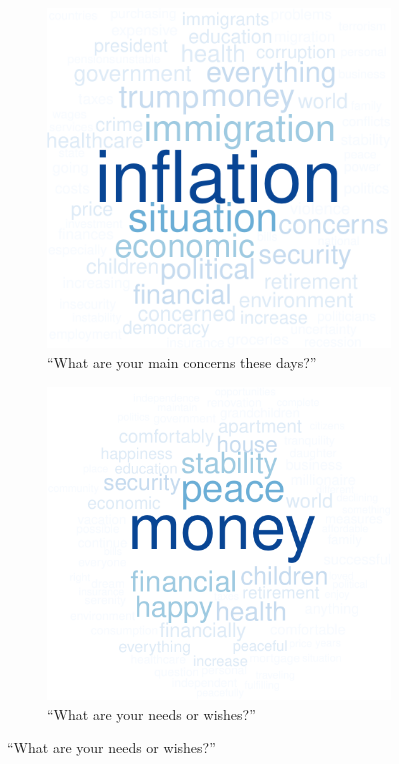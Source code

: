 \documentclass[12pt,english]{article}
\begin{document}
\begin{bibunit}
\begin{figure}[h!]
  \caption[Wordcloud of open-ended field, per variant]{Most common concepts in open-ended fields. (Questions \ref{q:concerns_field}-\ref{q:injustice_field})} \label{fig:wordcloud} %
  \begin{subfigure}{.48\textwidth}
    \caption[]{``What are your main concerns these days?''}
    \includegraphics[height=.35\textheight]{../figures/all/concerns_field_en.pdf}
  \end{subfigure} \quad
  \begin{subfigure}{.48\textwidth}
    \caption[]{``What are your needs or wishes?''}
    \includegraphics[height=.35\textheight]{../figures/all/wish_field_en.pdf}

\end{subfigure}
\end{figure}
\end{bibunit}
\end{document}
